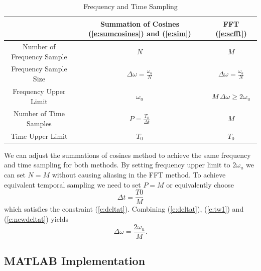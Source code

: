 \documentclass[techreport, article]{npsreport2018}
\begin{document}
\begin{table}[!ht]
\renewcommand{\arraystretch}{1.3}
\caption{Frequency and Time Sampling}
\label{t:compare}
\centering
\begin{tabular}{c|c|c}
\hline
& \bfseries Summation of Cosines  (\ref{e:sumcosines}) and (\ref{e:sim}) & \bfseries FFT (\ref{e:scfft})\\
\hline\hline
Number of Frequency Sample & $N$ & $M$ \\ \hline
Frequency Sample Size  &  $\Delta \omega = \frac{\omega_{u}}{N}$ & $\Delta \omega = \frac{\omega_{u}}{N}$ \\ \hline
  Frequency Upper Limit & $ \omega_u$ & $ M \, \Delta\omega \geq2 \omega_u$ \\ \hline
  Number of Time Samples & $P=\frac{T_0}{\Delta t}$ & $M$ \\ \hline
  Time Upper Limit & $T_0$ & $T_0$ \\
\hline
\end{tabular}
\end{table}

We can adjust the summations of cosines method to achieve the same frequency and time sampling for both methods.  By setting frequency upper limit to  $2\omega_u$ we can set $N=M$ without causing aliasing in the FFT method.  To achieve equivalent temporal sampling we need to set $P=M$ or equivalently choose
\begin{equation}
  \Delta t = \frac{T0}{M}
  \label{e:newdeltat}
\end{equation}
which satisfies the constraint (\ref{e:deltat}).  Combining (\ref{e:deltat}), (\ref{e:tw1}) and (\ref{e:newdeltat}) yields
\begin{equation}
  \Delta \omega = \frac{2 \omega_u}{M}.
\end{equation}

\subsection{MATLAB Implementation}
\end{document}
